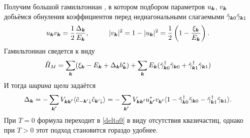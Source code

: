 Получим большой гамильтониан \cite{tinkham}, в котором подбором параметров $u_{{\boldsymbol{k}}}$, $v_{{\boldsymbol{k}}}$ добьёмся обнуления коэффициентов перед недиагональными слагаемыми $\hat{\gamma}_{{\boldsymbol{k}} 0}\hat{\gamma}_{{\boldsymbol{k}} 1}$
\begin{equation*}
	u_{{\boldsymbol{k}}} v_{{\boldsymbol{k}}} = \frac{1}{2} \frac{\Delta_{{\boldsymbol{k}}}}{E_{{\boldsymbol{k}}}},
	\hspace{1.0 cm}
	|v_{{\boldsymbol{k}}}|^2 = 1 - |u_{{\boldsymbol{k}}}|^2 = \frac{1}{2} \left(1 - \frac{\xi_{{\boldsymbol{k}}}}{E_{{\boldsymbol{k}}}}\right).
\end{equation*}
Гамильтониан сведется к виду
\begin{equation*}
	\hat{H}_M = \sum_{{\boldsymbol{k}}} (\xi_{{\boldsymbol{k}}} - E_{{\boldsymbol{k}}} + \Delta_{{\boldsymbol{k}}} b_{{\boldsymbol{k}}}^*) + \sum_{{\boldsymbol{k}}} E_{{\boldsymbol{k}}} (\hat{\gamma}_{{\boldsymbol{k}}0}^\dagger \hat{\gamma}_{{\boldsymbol{k}} 0} + \hat{\gamma}_{{\boldsymbol{k}} 1}^\dagger \hat{\gamma}_{{\boldsymbol{k}} 1})
\end{equation*}
И тогда \textit{ширина щели} задаётся
\begin{equation}
	\Delta_{{\boldsymbol{k}}} = - \sum_{{\boldsymbol{k'}}} V_{{\boldsymbol{k}} {\boldsymbol{k'}}} \langle \hat{c}_{-{\boldsymbol{k}}'\downarrow} \hat{c}_{{\boldsymbol{k}}'\downarrow} \rangle
	=
	- \sum_{{\boldsymbol{k'}}} V_{{\boldsymbol{k}} {\boldsymbol{k'}}} u_{{\boldsymbol{k'}}}^* v_{{\boldsymbol{k'}}} \langle 1 - \hat{\gamma}_{{\boldsymbol{k}}0}^\dagger \hat{\gamma}_{{\boldsymbol{k}} 0} - \hat{\gamma}_{{\boldsymbol{k}} 1}^\dagger \hat{\gamma}_{{\boldsymbol{k}} 1}\rangle.
	\label{ff}
\end{equation} 
При $T=0$ формула переходит в \eqref{delta0} в виду отсутствия квазичастиц, однако при $T>0$ этот подход становится гораздо удобнее. 